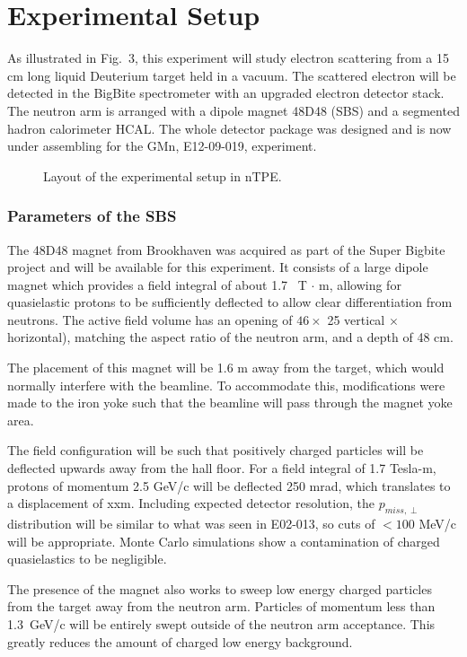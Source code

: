 \section{Experimental Setup}
%
\label{sec:expsetup}

As illustrated in Fig.~3, this experiment will study electron scattering from a 15 cm long 
liquid Deuterium target held in a vacuum.
The scattered electron will be detected in the BigBite spectrometer with an upgraded electron detector stack. 
The neutron arm is arranged with a dipole magnet 48D48 (SBS) and a segmented hadron calorimeter HCAL.  
The whole detector package was designed and is now under assembling for the GMn, E12-09-019, experiment. 

\begin{figure}[bh]
	\caption{Layout of the experimental setup in nTPE.}	
\label{pic:expsetup}
\end{figure}

\subsubsection{Parameters of the SBS}

The 48D48 magnet from Brookhaven was acquired as part of the Super Bigbite project and will be available for this experiment.  
It consists of a large dipole magnet which provides a field integral of about 1.7~ T $\cdot$ m, allowing for quasielastic 
protons to be sufficiently deflected to allow clear differentiation from neutrons.  
The active field volume has an opening of $46 \times$ 25 vertical $\times$ horizontal), 
matching the aspect ratio of the neutron arm, and a depth of 48 cm.

The placement of this magnet will be 1.6 m away from the target, which would normally interfere with the beamline.  
To accommodate this, modifications were made to the iron yoke such that the beamline will pass through the magnet yoke area.

The field configuration will be such that positively charged particles will be deflected upwards away from the hall floor.  
For a field integral of 1.7 Tesla-m, protons of momentum 2.5 GeV/c will be deflected 250 mrad,
 which translates to a displacement of xxm.  
 Including expected detector resolution,  the $p_{miss,\perp}$ distribution will be similar to 
 what was seen in E02-013, so cuts of  $< 100$ MeV/c will be appropriate.  
Monte Carlo simulations show a contamination of charged quasielastics to be negligible.

The presence of the magnet also works to sweep low energy charged particles from the target away from the neutron arm.  
Particles of momentum less than 1.3~{GeV/c} will be entirely swept outside of the neutron arm acceptance.  
This greatly reduces the amount of charged low energy background.
%


